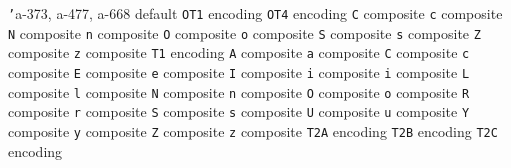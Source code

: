 \documentclass[twoside]{ltxdoc}
\makeatletter
\renewenvironment{theindex}{%
   \@restonecoltrue
   \if@twocolumn\@restonecolfalse\fi
   \columnseprule \z@
   \columnsep 35\p@
   \twocolumn[\index@prologue]%
   \IndexParms
   \let\item\@idxitem
   \ignorespaces
}{\if@restonecol\onecolumn\else\clearpage\fi}
\makeatother
\begin{document}
\begin{theindex}
  \item \texttt  {'}\pfill a-373, a-477, a-668
    \subitem default\pfill {}
    \subitem \texttt  {OT1} encoding\pfill {}
    \subitem \texttt  {OT4} encoding\pfill {}
      \subsubitem \texttt  {C} composite\pfill {}
      \subsubitem \texttt  {c} composite\pfill {}
      \subsubitem \texttt  {N} composite\pfill {}
      \subsubitem \texttt  {n} composite\pfill {}
      \subsubitem \texttt  {O} composite\pfill {}
      \subsubitem \texttt  {o} composite\pfill {}
      \subsubitem \texttt  {S} composite\pfill {}
      \subsubitem \texttt  {s} composite\pfill {}
      \subsubitem \texttt  {Z} composite\pfill {}
      \subsubitem \texttt  {z} composite\pfill {}
    \subitem \texttt  {T1} encoding\pfill {}
      \subsubitem \texttt  {A} composite\pfill {}
      \subsubitem \texttt  {a} composite\pfill {}
      \subsubitem \texttt  {C} composite\pfill {}
      \subsubitem \texttt  {c} composite\pfill {}
      \subsubitem \texttt  {E} composite\pfill {}
      \subsubitem \texttt  {e} composite\pfill {}
      \subsubitem \texttt  {I} composite\pfill {}
      \subsubitem \texttt  {i} composite\pfill {}
      \subsubitem \texttt  {i} composite\pfill 
      \subsubitem \texttt  {L} composite\pfill {}
      \subsubitem \texttt  {l} composite\pfill {}
      \subsubitem \texttt  {N} composite\pfill {}
      \subsubitem \texttt  {n} composite\pfill {}
      \subsubitem \texttt  {O} composite\pfill {}
      \subsubitem \texttt  {o} composite\pfill {}
      \subsubitem \texttt  {R} composite\pfill {}
      \subsubitem \texttt  {r} composite\pfill {}
      \subsubitem \texttt  {S} composite\pfill {}
      \subsubitem \texttt  {s} composite\pfill {}
      \subsubitem \texttt  {U} composite\pfill {}
      \subsubitem \texttt  {u} composite\pfill {}
      \subsubitem \texttt  {Y} composite\pfill {}
      \subsubitem \texttt  {y} composite\pfill {}
      \subsubitem \texttt  {Z} composite\pfill {}
      \subsubitem \texttt  {z} composite\pfill {}
    \subitem \texttt  {T2A} encoding\pfill {}
    \subitem \texttt  {T2B} encoding\pfill {}
    \subitem \texttt  {T2C} encoding\pfill {}

\end{theindex}
\end{document}
